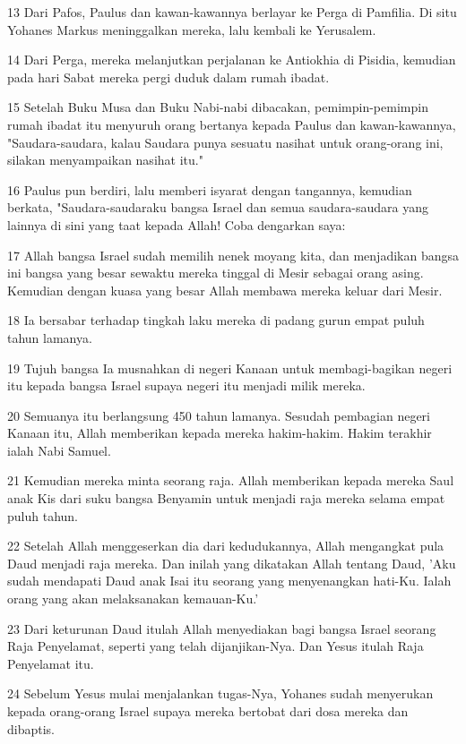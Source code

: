 \par 13 Dari Pafos, Paulus dan kawan-kawannya berlayar ke Perga di Pamfilia. Di situ Yohanes Markus meninggalkan mereka, lalu kembali ke Yerusalem.
\par 14 Dari Perga, mereka melanjutkan perjalanan ke Antiokhia di Pisidia, kemudian pada hari Sabat mereka pergi duduk dalam rumah ibadat.
\par 15 Setelah Buku Musa dan Buku Nabi-nabi dibacakan, pemimpin-pemimpin rumah ibadat itu menyuruh orang bertanya kepada Paulus dan kawan-kawannya, "Saudara-saudara, kalau Saudara punya sesuatu nasihat untuk orang-orang ini, silakan menyampaikan nasihat itu."
\par 16 Paulus pun berdiri, lalu memberi isyarat dengan tangannya, kemudian berkata, "Saudara-saudaraku bangsa Israel dan semua saudara-saudara yang lainnya di sini yang taat kepada Allah! Coba dengarkan saya:
\par 17 Allah bangsa Israel sudah memilih nenek moyang kita, dan menjadikan bangsa ini bangsa yang besar sewaktu mereka tinggal di Mesir sebagai orang asing. Kemudian dengan kuasa yang besar Allah membawa mereka keluar dari Mesir.
\par 18 Ia bersabar terhadap tingkah laku mereka di padang gurun empat puluh tahun lamanya.
\par 19 Tujuh bangsa Ia musnahkan di negeri Kanaan untuk membagi-bagikan negeri itu kepada bangsa Israel supaya negeri itu menjadi milik mereka.
\par 20 Semuanya itu berlangsung 450 tahun lamanya. Sesudah pembagian negeri Kanaan itu, Allah memberikan kepada mereka hakim-hakim. Hakim terakhir ialah Nabi Samuel.
\par 21 Kemudian mereka minta seorang raja. Allah memberikan kepada mereka Saul anak Kis dari suku bangsa Benyamin untuk menjadi raja mereka selama empat puluh tahun.
\par 22 Setelah Allah menggeserkan dia dari kedudukannya, Allah mengangkat pula Daud menjadi raja mereka. Dan inilah yang dikatakan Allah tentang Daud, 'Aku sudah mendapati Daud anak Isai itu seorang yang menyenangkan hati-Ku. Ialah orang yang akan melaksanakan kemauan-Ku.'
\par 23 Dari keturunan Daud itulah Allah menyediakan bagi bangsa Israel seorang Raja Penyelamat, seperti yang telah dijanjikan-Nya. Dan Yesus itulah Raja Penyelamat itu.
\par 24 Sebelum Yesus mulai menjalankan tugas-Nya, Yohanes sudah menyerukan kepada orang-orang Israel supaya mereka bertobat dari dosa mereka dan dibaptis.
